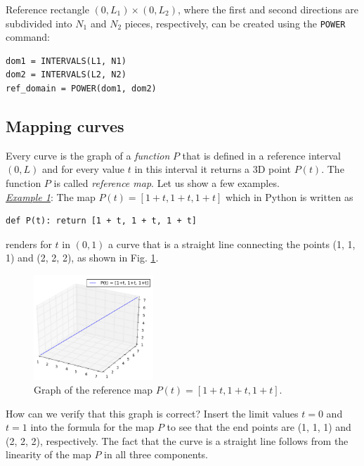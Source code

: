 \noindent
Reference rectangle $(0, L_1) \times (0, L_2)$, where the first and second 
directions are subdivided into $N_1$ and $N_2$ pieces, respectively, can be 
created using the {\tt POWER} command:\\

\begin{bbox}
\begin{verbatim}
dom1 = INTERVALS(L1, N1)
dom2 = INTERVALS(L2, N2)
ref_domain = POWER(dom1, dom2)
\end{verbatim}
\end{bbox}

\subsection{Mapping curves}

Every curve is the graph of a {\em function} $P$ that is defined 
in a reference interval $(0, L)$ and for every value $t$ in this 
interval it returns a 3D point $P(t)$. The function 
$P$ is called {\em reference map}. Let us show a few examples.\\

\noindent
\underline{\em Example 1}: The map
$
P(t) = [1+t, 1+t, 1+t]
$
which in Python is written as\\

\begin{bbox}
\begin{verbatim}
def P(t): return [1 + t, 1 + t, 1 + t]
\end{verbatim}
\end{bbox}
\vspace{6mm}

\noindent
renders for $t$ in $(0, 1)$ a curve that is a straight line connecting the 
points (1, 1, 1) and (2, 2, 2), as shown in Fig. \ref{fig:paramcu1}.\\[-9mm]

\begin{figure}[!ht]
\begin{center}
\includegraphics[width=0.4\textwidth]{img/paramcu1.png}
\end{center}
\vspace{-6mm}
\caption{Graph of the reference map $P(t) = [1+t, 1+t, 1+t]$.}
\vspace{-1cm}
\label{fig:paramcu1}
\end{figure}
\newpage
\noindent
How can we verify that this graph is correct? 
Insert the limit values $t = 0$ and $t = 1$ into the formula for the map $P$ 
to see that the end points are (1, 1, 1) and (2, 2, 2), respectively. The 
fact that the curve is a straight line follows from the linearity of the 
map $P$ in all three components. \\

